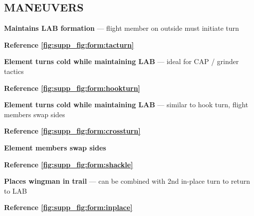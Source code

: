 \subsection{MANEUVERS}

\begin{tcoloritemize}
    \textbf{Maintains LAB formation} --- flight member on outside must initiate turn
    
    \hfill\textbf{Reference \cref{fig:supp_fig:form:tacturn}}

    \textbf{Element turns cold while maintaining LAB} --- ideal for CAP / grinder tactics
    
    \hfill\textbf{Reference \cref{fig:supp_fig:form:hookturn}}

    \textbf{Element turns cold while maintaining LAB} --- similar to hook turn, flight members swap sides
    
    \hfill\textbf{Reference \cref{fig:supp_fig:form:crossturn}}

    \blueitem[Shackle]
    \textbf{Element members swap sides}
    
    \hfill\textbf{Reference \cref{fig:supp_fig:form:shackle}}

    \textbf{Places wingman in trail} --- can be combined with 2nd in-place turn to return to LAB

    \hfill\textbf{Reference \cref{fig:supp_fig:form:inplace}}
\end{tcoloritemize}

